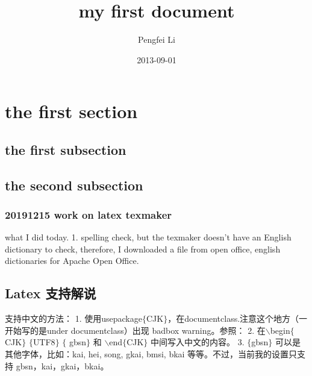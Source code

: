 \documentclass[UTF8]{article}
\title{my first document}
\author{Pengfei Li}
\date{2013-09-01}
\begin{document}
\newpage

\begin{CJK}{UTF8}{gbsn}
\maketitle
\end{CJK}

\newpage
{}
\section{the first section}
\subsection{the first subsection}
\subsection{the second subsection}
\subsubsection{20191215 work on latex texmaker}

what I did today.
1. spelling check, but the texmaker doesn't have an English dictionary to check, therefore, I downloaded a file from open office, english dictionaries for Apache Open Office.

\newpage
\begin{CJK*}{UTF8}{gbsn}
\section{Latex 支持解说}

支持中文的方法：
1. 使用usepackage$\lbrace$CJK$\rbrace$，在documentclass.注意这个地方（一开始写的是under documentclass）出现 badbox warning。参照：
2. 在$\backslash$begin$\lbrace$CJK$\rbrace$ $\lbrace$UTF8$\rbrace$ $\lbrace$ gbsn$\rbrace$ 和 $\backslash$end$\lbrace$CJK$\rbrace$ 中间写入中文的内容。
3. $\lbrace$gbsn$\rbrace$ 可以是其他字体，比如：kai, hei, song, gkai, bmsi, bkai 等等。不过，当前我的设置只支持 gbsn，kai，gkai，bkai。


\end{CJK*}
\end{document}
